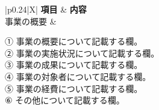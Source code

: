 \documentclass[UTF8,10pt,a4paper,fontset=fandol]{ctexart}
\begin{document}
\begin{tabularx}{\textwidth}{|p{0.24\textwidth}|X|}
\hline
\textbf{項目} & \textbf{内容} \\
\hline
事業の概要 &
\begin{minipage}[t]{\linewidth}
① 事業の概要について記載する欄。\\[2pt]
② 事業の実施状況について記載する欄。\\[2pt]
③ 事業の成果について記載する欄。\\[2pt]
④ 事業の対象者について記載する欄。\\[2pt]
⑤ 事業の経費について記載する欄。\\[2pt]
⑥ その他について記載する欄。
\end{minipage}
\\
\hline
\end{tabularx}

\vspace{0.5em}
\end{document}
